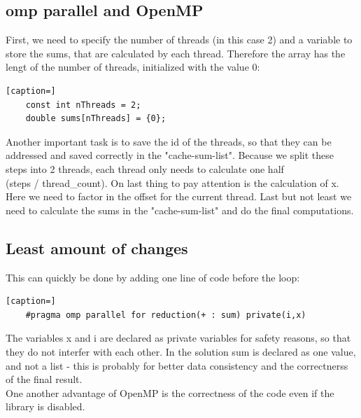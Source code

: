 \documentclass{article}
\begin{document}
\subsection{omp parallel and OpenMP}
First, we need to specify the number of threads (in this case 2) and a
variable to store the sums, that are calculated by each thread. Therefore
the array has the lengt of the number of threads, initialized with the
value 0:
\begin{lstlisting}[caption=]
    const int nThreads = 2;
    double sums[nThreads] = {0};
\end{lstlisting}
Another important task is to save the id of the threads, so that they
can be addressed and saved correctly in the "cache-sum-list".
Because we split these steps into 2 threads, each thread only needs
to calculate one half \\(steps / thread\_count). On last thing to pay
attention is the calculation of x. Here we need to factor in the offset
for the current thread. Last but not least we need to calculate the sums
in the "cache-sum-list" and do the final computations.

\subsection*{Least amount of changes}
This can quickly be done by adding one line of code before the loop:
\begin{lstlisting}[caption=]
    #pragma omp parallel for reduction(+ : sum) private(i,x)
\end{lstlisting}
The variables x and i are declared as private variables for safety reasons,
so that they do not interfer with each other. In the solution sum is
declared as one value, and not a list - this is probably for better
data consistency and the correctnerss of the final result.\\
One another advantage of OpenMP is the correctness of the code even if the library
is disabled.
\end{document}

